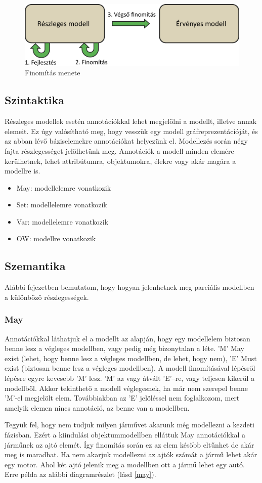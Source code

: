 \begin{figure}[!ht]
	\centering
	\includegraphics[width=130mm]{figures/finom.pdf}
	\caption{Finomítás menete} 
	\label{finomit}
\end{figure}

\subsection{Szintaktika}
Részleges modellek esetén annotációkkal lehet megjelölni a modellt, illetve annak elemeit. Ez úgy valósítható meg, hogy vesszük egy modell gráfreprezentációját, és az abban lévő báziselemekre annotációkat helyezünk el. Modellezés során négy fajta részlegességet jelölhetünk meg. Annotációk a modell minden elemére kerülhetnek, lehet attribútumra, objektumokra, élekre vagy akár magára a modellre is.
\begin{itemize}  
	\item May: modellelemre vonatkozik
	\item Set: modellelemre vonatkozik
	\item Var: modellelemre vonatkozik
	\item OW: modellre vonatkozik
\end{itemize}


\subsection{Szemantika}
Alábbi fejezetben bemutatom, hogy hogyan jelenhetnek meg parciális modellben a különböző részlegességek.
\subsubsection{May}
Annotációkkal láthatjuk el a modellt az alapján, hogy egy modellelem biztosan benne lesz a végleges modellben, vagy pedig még bizonytalan a léte. \textsf{’M’} May exist (lehet, hogy benne lesz a végleges modellben, de lehet, hogy nem), \textsf{’E’} Must exist (biztosan benne lesz a végleges modellben). A modell finomításával lépésről lépésre egyre kevesebb ’M’ lesz.  \textsf{’M’} az vagy átvált \textsf{’E’}–re, vagy teljesen kikerül a modellből. Akkor tekinthető a modell véglegesnek, ha már nem szerepel benne \textsf{’M’}-el megjelölt elem. Továbbiakban az \textsf{’E’} jelöléssel nem foglalkozom, mert amelyik elemen nincs annotáció, az benne van a modellben.
\par
Tegyük fel, hogy nem tudjuk milyen járművet akarunk még modellezni a kezdeti fázisban. Ezért a kiindulási objektummodellben elláttuk May annotációkkal a járműnek az ajtó elemét. Így finomítás során ez az elem később eltűnhet de akár meg is maradhat. Ha nem akarjuk modellezni az ajtók számát a jármű lehet akár egy motor. Ahol két ajtó jelenik meg a modellben ott a jármű lehet egy autó. Erre példa az alábbi diagramrészlet (lásd \autoref{may}).


